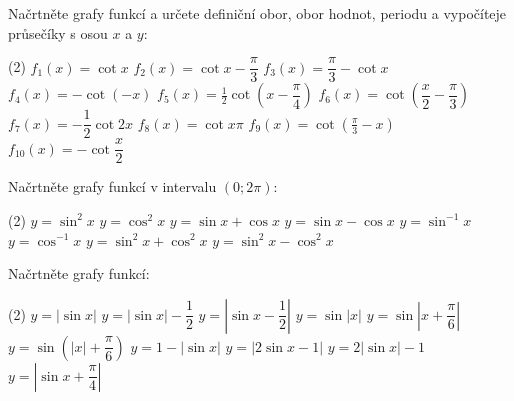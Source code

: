 \documentclass[12pt,a4paper]{article}
\begin{document}
\begin{exercise}
    Načrtněte grafy funkcí a určete definiční obor, obor hodnot, periodu a vypočíteje průsečíky s osou $x$ a $y$:
    \begin{tasks}(2)
        \task $f_1(x) = \cot x$
        \task $f_2(x) = \cot x - \dfrac{\pi}{3}$
        \task $f_3(x) = \dfrac{\pi}{3} - \cot x$
        \task $f_4(x) = -\cot(-x)$
        \task $f_5(x) = \frac{1}{2} \cot \left(x - \dfrac{\pi}{4}\right)$
        \task $f_6(x) = \cot \left(\dfrac{x}{2} - \dfrac{\pi}{3}\right)$
        \task $f_7(x) = -\dfrac{1}{2} \cot 2x$
        \task $f_8(x) = \cot x\pi$
        \task $f_9(x) = \cot \left(\frac{\pi}{3} - x\right)$
        \task $f_{10}(x) = -\cot \dfrac{x}{2}$
    \end{tasks}
\end{exercise}


\begin{exercise}
    Načrtněte grafy funkcí v intervalu $\left(0; 2\pi\right)$:
    \begin{tasks}(2)
        \task $y = \sin^2 x$
        \task $y = \cos^2 x$
        \task $y = \sin x + \cos x$
        \task $y = \sin x - \cos x$
        \task $y = \sin^{-1} x$
        \task $y = \cos^{-1} x$
        \task $y = \sin^2 x + \cos^2 x$
        \task $y = \sin^2 x - \cos^2 x$
    \end{tasks}
\end{exercise}


\setcounter{section}{3}
\begin{exercise}
    Načrtněte grafy funkcí:
    \begin{tasks}(2)
        \task $y = \left|\sin x \right|$
        \task $y = \left|\sin x \right| - \dfrac{1}{2}$
        \task $y = \left|\sin x - \dfrac{1}{2} \right|$
        \task $y = \sin \left|x\right|$
        \task $y = \sin \left|x + \dfrac{\pi}{6}\right|$
        \task $y = \sin\left(\left|x\right| + \dfrac{\pi}{6}\right)$
        \task $y = 1 - \left|\sin x \right|$
        \task $y = \left|2 \sin x - 1\right|$
        \task $y = 2 \left|\sin x\right| - 1$
        \task $y = \left|\sin x + \dfrac{\pi}{4}\right|$
    \end{tasks}
\end{exercise}
\end{document}
